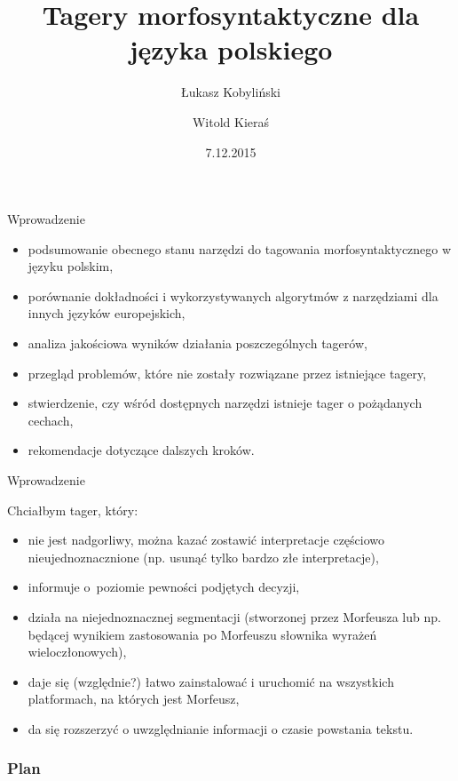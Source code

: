 \documentclass[xcolor=dvipsnames,polish]{beamer}
\title{Tagery morfosyntaktyczne dla języka polskiego}
\author{Łukasz Kobyliński \and Witold Kieraś}
\institute[IPI PAN]{%
     Instytut Podstaw Informatyki Polskiej Akademii Nauk\\
     ul. Jana Kazimierza 5, 01-248 Warszawa, Poland}
\date{7.12.2015}
\begin{document}
\begin{frame}
  \titlepage
\end{frame}

\begin{frame}{Wprowadzenie}
\begin{itemize}
  \item podsumowanie obecnego stanu narzędzi do tagowania morfosyntaktycznego w języku polskim,
  \item porównanie dokładności i wykorzystywanych algorytmów z narzędziami dla innych języków europejskich,
  \item analiza jakościowa wyników działania poszczególnych tagerów,
  \item przegląd problemów, które nie zostały rozwiązane przez istniejące tagery,
  \item stwierdzenie, czy wśród dostępnych narzędzi istnieje tager o pożądanych cechach,%
  \item rekomendacje dotyczące dalszych kroków.
\end{itemize}
\end{frame}

\begin{frame}{Wprowadzenie}
  \vspace{0.5cm}

  Chciałbym tager, który:
   \begin{itemize}
   \item nie jest nadgorliwy, można kazać zostawić interpretacje częściowo nieujednoznacznione (np. usunąć tylko bardzo złe interpretacje),
   \item informuje o~poziomie pewności podjętych decyzji,
   \item działa na niejednoznacznej segmentacji (stworzonej przez Morfeusza lub np. będącej wynikiem zastosowania po Morfeuszu słownika wyrażeń wieloczłonowych),
   \item daje się (względnie?) łatwo zainstalować i uruchomić na wszystkich platformach, na których jest Morfeusz,
   \item da się rozszerzyć o uwzględnianie informacji o czasie powstania tekstu.
   \end{itemize}
\end{frame}

\begin{frame}
\frametitle{Plan}
\tableofcontents
\end{frame}
\end{document}
